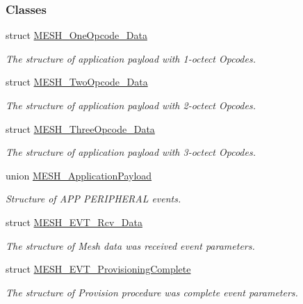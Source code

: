 \subsubsection*{Classes}
\begin{DoxyCompactItemize}
\item 
struct \hyperlink{struct_m_e_s_h___one_opcode___data}{M\+E\+S\+H\+\_\+\+One\+Opcode\+\_\+\+Data}
\begin{DoxyCompactList}\small\item\em The structure of application payload with 1-\/octect Opcodes. \end{DoxyCompactList}\item 
struct \hyperlink{struct_m_e_s_h___two_opcode___data}{M\+E\+S\+H\+\_\+\+Two\+Opcode\+\_\+\+Data}
\begin{DoxyCompactList}\small\item\em The structure of application payload with 2-\/octect Opcodes. \end{DoxyCompactList}\item 
struct \hyperlink{struct_m_e_s_h___three_opcode___data}{M\+E\+S\+H\+\_\+\+Three\+Opcode\+\_\+\+Data}
\begin{DoxyCompactList}\small\item\em The structure of application payload with 3-\/octect Opcodes. \end{DoxyCompactList}\item 
union \hyperlink{union_m_e_s_h___application_payload}{M\+E\+S\+H\+\_\+\+Application\+Payload}
\begin{DoxyCompactList}\small\item\em Structure of A\+PP P\+E\+R\+I\+P\+H\+E\+R\+AL events. \end{DoxyCompactList}\item 
struct \hyperlink{struct_m_e_s_h___e_v_t___rcv___data}{M\+E\+S\+H\+\_\+\+E\+V\+T\+\_\+\+Rcv\+\_\+\+Data}
\begin{DoxyCompactList}\small\item\em The structure of Mesh data was received event parameters. \end{DoxyCompactList}\item 
struct \hyperlink{struct_m_e_s_h___e_v_t___provisioning_complete}{M\+E\+S\+H\+\_\+\+E\+V\+T\+\_\+\+Provisioning\+Complete}
\begin{DoxyCompactList}\small\item\em The structure of Provision procedure was complete event parameters. \end{DoxyCompactList}\item 

\end{DoxyCompactItemize}

